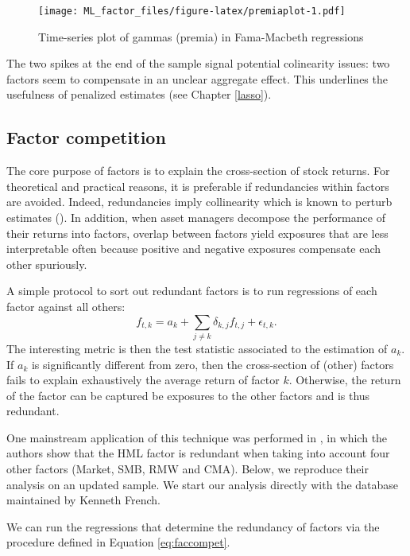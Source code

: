 \documentclass[]{krantz}
\theoremstyle{definition}
\theoremstyle{definition}
\theoremstyle{definition}
\theoremstyle{remark}
\begin{document}
\begin{figure}
\centering
\texttt{[image: ML\_factor\_files/figure-latex/premiaplot-1.pdf]}
\caption{\label{fig:premiaplot}Time-series plot of gammas (premia) in
Fama-Macbeth regressions}
\end{figure}

\normalsize

The two spikes at the end of the sample signal potential colinearity
issues: two factors seem to compensate in an unclear aggregate effect.
This underlines the usefulness of penalized estimates (see Chapter
\ref{lasso}).

\hypertarget{factor-competition}{%
\subsection{Factor competition}\label{factor-competition}}

The core purpose of factors is to explain the cross-section of stock
returns. For theoretical and practical reasons, it is preferable if
redundancies within factors are avoided. Indeed, redundancies imply
collinearity which is known to perturb estimates
(\citet{belsley2005regression}). In addition, when asset managers
decompose the performance of their returns into factors, overlap between
factors yield exposures that are less interpretable often because
positive and negative exposures compensate each other spuriously.

A simple protocol to sort out redundant factors is to run regressions of
each factor against all others: \begin{equation}
 \label{eq:faccompet}
f_{t,k} = a_k +\sum_{j\neq k} \delta_{k,j} f_{t,j} + \epsilon_{t,k}.
\end{equation} The interesting metric is then the test statistic
associated to the estimation of \(a_k\). If \(a_k\) is significantly
different from zero, then the cross-section of (other) factors fails to
explain exhaustively the average return of factor \(k\). Otherwise, the
return of the factor can be captured be exposures to the other factors
and is thus redundant.

One mainstream application of this technique was performed in
\citet{fama2015five}, in which the authors show that the HML factor is
redundant when taking into account four other factors (Market, SMB, RMW
and CMA). Below, we reproduce their analysis on an updated sample. We
start our analysis directly with the database maintained by Kenneth
French.

We can run the regressions that determine the redundancy of factors via
the procedure defined in Equation \eqref{eq:faccompet}.
\end{document}
